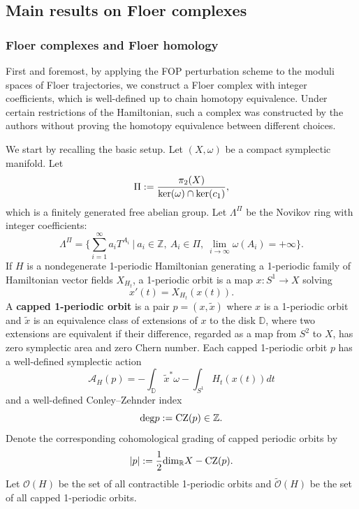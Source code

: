 \documentclass[reqno, 10pt]{amsart}
\numberwithin{equation}{section}
\numberwithin{equation}{section}
\theoremstyle{definition}
\theoremstyle{remark}
\newcommand{\beq}{\begin{equation}}
\newcommand{\eeq}{\end{equation}}
\newcommand{\beqn}{\begin{equation*}}
\newcommand{\eeqn}{\end{equation*}}
\newcommand{\mb}{\mathbb}
\newcommand{\mc}{\mathcal}
\begin{document}
\subsection{Main results on Floer complexes}










\subsubsection{Floer complexes and Floer homology}

First and foremost, by applying the FOP perturbation scheme to the moduli spaces of Floer trajectories, we construct a Floer complex with integer coefficients, which is well-defined up to chain homotopy equivalence. Under certain restrictions of the Hamiltonian, such a  complex was constructed by the authors \cite{Bai_Xu_Arnold} without proving the  homotopy equivalence between different choices. 

We start by recalling the basic setup. Let $(X, \omega)$ be a compact symplectic manifold. Let 
\beq\label{Novikov_group}
\Pi:= \frac{ \pi_2(X) }{{\rm ker} (\omega) \cap {\rm ker} (c_1)},
\eeq
which is a finitely generated free abelian group. Let $\Lambda^\Pi$ be the Novikov ring with integer coefficients:
\beq\label{Novikov_ring}
\Lambda^\Pi = \Big\{ \sum_{i=1}^\infty a_i T^{A_i}\ |\ a_i \in {\mb Z},\ A_i \in \Pi,\ \lim_{i \to \infty} \omega(A_i) = +\infty \Big\}.
\eeq
If $H$ is a nondegenerate 1-periodic Hamiltonian generating a 1-periodic family of Hamiltonian vector fields $X_{H_t}$, a 1-periodic orbit is a map $x: S^1 \to X$ solving
\beqn
x'(t) = X_{H_t}(x(t)).
\eeqn
A {\bf capped 1-periodic orbit} is a pair $p = (x, \tilde x)$ where $x$ is a 1-periodic orbit and $\tilde x$ is an equivalence class of extensions of $x$ to the disk ${\mb D}$, where two extensions are equivalent if their difference, regarded as a map from $S^2$ to $X$, has zero symplectic area and zero Chern number. Each capped 1-periodic orbit $p$ has a well-defined symplectic action
\beq\label{symplectic_action}
{\mc A}_H(p) = - \int_{\mb D} \tilde x^* \omega - \int_{S^1} H_t(x(t)) dt
\eeq
and a well-defined Conley--Zehnder index
\beqn
{\rm deg} p:= {\rm CZ}(p) \in {\mb Z}.
\eeqn
Denote the corresponding cohomological grading of capped periodic orbits by 
\beqn
|p|:= \frac{1}{2} {\rm dim}_{\mb R} X - {\rm CZ}(p).
\eeqn
Let ${\mc O}(H)$ be the set of all contractible 1-periodic orbits and $\tilde {\mc O}(H)$ be the set of all capped 1-periodic orbits. 
\end{document}
